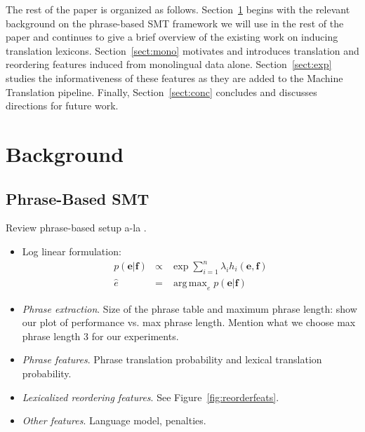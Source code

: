 \documentclass[11pt]{article}
\DeclareMathOperator*{\argmax}{arg\,max}
\newcommand{\secref}[1]{Section~\ref{#1}}
\newcommand{\figref}[1]{Figure~\ref{#1}}
\begin{document}
The rest of the paper is organized as follows.  \secref{sect:bckg} begins with the relevant background on the phrase-based SMT framework we will use in the rest of the paper and continues to give a brief overview of the existing work on inducing translation lexicons.
 \secref{sect:mono} motivates and introduces translation and reordering features induced from monolingual data alone.   \secref{sect:exp} studies the informativeness of these features as they are added to the Machine Translation pipeline.  Finally, \secref{sect:conc} concludes and discusses directions for future work.


\section{Background} \label{sect:bckg}
\subsection{Phrase-Based SMT} \label{sect:bckg:smt}

Review phrase-based setup a-la \cite{Koehn:2003}.

\begin{itemize}
\item Log linear formulation:
  \begin{eqnarray*}
    p(\mathbf{e} | \mathbf{f}) & \propto & \exp \sum_{i=1}^{n}{\lambda_i h_i (\mathbf{e}, \mathbf{f})} \label{log-linear-formulation}\\
    \hat{e} & = & \argmax_{e}{p(\mathbf{e} | \mathbf{f}) }
  \end{eqnarray*}

\item \emph{Phrase extraction}.  Size of the phrase table and maximum phrase length: show our plot of performance vs. max phrase length.  Mention what we choose max phrase length 3 for our experiments.

\item \emph{Phrase features}.  Phrase translation probability and lexical translation probability.

\item \emph{Lexicalized reordering features}.  See \figref{fig:reorderfeats}.

\item \emph{Other features}. Language model, penalties.

\end{itemize}
\end{document}
